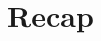 \documentclass[12pt]{article}
\begin{document}
\title{}

\author{Ethan Chen}

\date{ }

\maketitle

\section{Recap}
\end{document}

